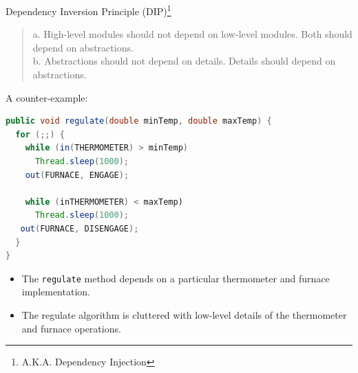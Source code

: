\documentclass{beamer}
\begin{document}
\begin{frame}[fragile]{Dependency Inversion Principle (DIP)\footnote{A.K.A. Dependency Injection}}
\vspace{-.05in}
\begin{quote}
a. High-level modules should not depend on low-level modules.  Both should depend on abstractions.\\
b. Abstractions should not depend on details.  Details should depend on abstractions.
\end{quote}
\vspace{-.1in}
A counter-example:
\vspace{-.05in}
\begin{lstlisting}[language=Java]
public void regulate(double minTemp, double maxTemp) {
  for (;;) {
    while (in(THERMOMETER) > minTemp)
      Thread.sleep(1000);
    out(FURNACE, ENGAGE);

    while (inTHERMOMETER) < maxTemp)
      Thread.sleep(1000);
   out(FURNACE, DISENGAGE);
  }
}
\end{lstlisting}
\vspace{-.125in}
\begin{itemize}
\item The {\tt regulate} method depends on a particular thermometer and furnace implementation.
\item The regulate algorithm is cluttered with low-level details of the thermometer and furnace operations.
\end{itemize}


\end{frame}
\end{document}
